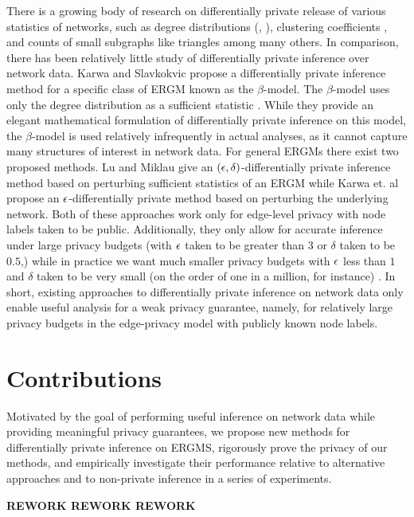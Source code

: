 There is a growing body of research on differentially private release of various statistics of networks, such as degree distributions (\cite{HLMJ09}, \cite{WNM16}), clustering coefficients \cite{WWZX12}, and counts of small subgraphs like triangles \cite{KRSY14} among many others. In comparison, there has been relatively little study of differentially private inference over network data. Karwa and Slavkokvic propose a differentially private inference method for a specific class of ERGM known as the $\beta$-model. The $\beta$-model uses only the degree distribution as a sufficient statistic \cite{KS16}. While they provide an elegant mathematical formulation of differentially private inference on this model, the $\beta$-model is used relatively infrequently in actual analyses, as it cannot capture many structures of interest in network data. For general ERGMs there exist two proposed methods. Lu and Miklau \cite{LM14} give an $(\epsilon, \delta)$-differentially private inference method based on perturbing sufficient statistics of an ERGM while Karwa et. al \cite{KKS17} propose an $\epsilon$-differentially private method based on perturbing the underlying network. Both of these approaches work only for edge-level privacy with node labels taken to be public. Additionally, they only allow for accurate inference under large privacy budgets (with $\epsilon$ taken to be greater than $3$ or $\delta$ taken to be $0.5$,) while in practice we want much smaller privacy budgets with $\epsilon$ less than $1$ and $\delta$ taken to be very small (on the order of one in a million, for instance) \cite{N17}. In short, existing approaches to differentially private inference on network data only enable useful analysis for a weak privacy guarantee, namely, for relatively large privacy budgets in the edge-privacy model with publicly known node labels. 

\section{Contributions}

Motivated by the goal of performing useful inference on network data while providing meaningful privacy guarantees, we propose new methods for differentially private inference on ERGMS, rigorously prove the privacy of our methods, and empirically investigate their performance relative to alternative approaches and to non-private inference in a series of experiments. 

\textbf{REWORK REWORK REWORK}

